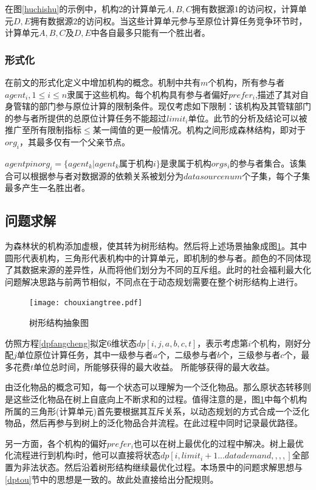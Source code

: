 \documentclass[promaster]{thesis-uestc}
\begin{document}
在图\ref{huchishu}的示例中，机构2的计算单元$A,B,C$拥有数据源$1$的访问权，计算单元$D,E$拥有数据源$2$的访问权。当这些计算单元参与至原位计算任务竞争环节时，计算单元$A,B,C$及$D,E$中各自最多只能有一个胜出者。
\subsubsection{形式化}

在前文的形式化定义中增加机构的概念。机制中共有$m$个机构，所有参与者$agent_i,1 \leq i \leq n$隶属于这些机构。每个机构具有参与者偏好$prefer_i$,描述了其对自身管辖的部门参与原位计算的限制条件。现仅考虑如下限制：该机构及其管辖部门的参与者所提供的总原位计算任务不能超过$limit_i$单位。此节的分析及结论可以被推广至所有限制指标$\leq$某一阈值的更一般情况。机构之间形成森林结构，即对于$org_i$，其最多仅有一个父亲节点。

$agentpinorg_i=\{agent_k|agent_k属于机构i\}$是隶属于机构$orgs_i$的参与者集合。该集合可以根据参与者对数据源的依赖关系被划分为$datasourcenum$个子集，每个子集最多产生一名胜出者。

\subsection{问题求解}
为森林状的机构添加虚根，使其转为树形结构。然后将上述场景抽象成图\ref{chouxiangtree}。其中圆形代表机构，三角形代表机构中的计算单元，即机制的参与者。颜色的不同体现了其数据来源的差异性，从而将他们划分为不同的互斥组。此时的社会福利最大化问题解决思路与前两节相似，不同点在于动态规划需要在整个树形结构上进行。

\begin{figure}[h]
    \texttt{[image: chouxiangtree.pdf]}
    \caption{树形结构抽象图}
    \label{chouxiangtree}
\end{figure}

仿照方程\ref{dpfangcheng}拟定6维状态$dp[i,j,a,b,c,t]$，表示考虑第$i$个机构，刚好分配$j$单位原位计算任务，其中一级参与者$a$个，二级参与者$b$个，三级参与者$c$个，最多花费$t$单位总时间，所能够获得的最大收益。
所能够获得的最大收益。

由泛化物品的概念可知，每一个状态可以理解为一个泛化物品。那么原状态转移则是这些泛化物品在树上自底向上不断求和的过程。值得注意的是，图\ref{chouxiangtree}中每个机构所属的三角形(计算单元)首先要根据其互斥关系，以动态规划的方式合成一个泛化物品，然后再参与到树上的泛化物品合并流程。在此过程中同时记录最优路径。

另一方面，各个机构的偏好$prefer_i$也可以在树上最优化的过程中解决。树上最优化流程进行到机构i时，他可以直接将状态$dp[i,limit_i+1...datademand,,,,]$全部置为非法状态。然后沿着树形结构继续最优化过程。本场景中的问题求解思想与\ref{dptou}节中的思想是一致的。故此处直接给出分配规则。
\end{document}
